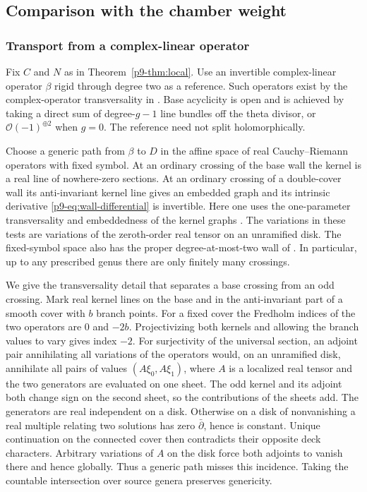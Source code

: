 \subsection{Comparison with the chamber weight}\label{p9-sec:comparison}

\subsubsection{Transport from a complex-linear operator}
Fix $C$ and $N$ as in Theorem~\ref{p9-thm:local}. Use an invertible
complex-linear operator $\beta$ rigid through degree two as a reference.
Such operators exist by the complex-operator transversality in
\cite[Lemmas~5.3, 5.6 and~5.15(ii), Definition~5.17]{bai}. Base acyclicity is
open and is achieved by taking a direct sum of degree-$g-1$ line
bundles off the theta divisor, or $\mathcal O(-1)^{\oplus2}$ when
$g=0$. The reference need not split holomorphically.

Choose a generic path from $\beta$ to $D$ in the affine space of real
Cauchy--Riemann operators with fixed symbol. At an ordinary crossing
of the base wall the kernel is a real line of nowhere-zero sections.
At an ordinary crossing of a double-cover wall its anti-invariant
kernel line gives an embedded graph and its intrinsic derivative
\eqref{p9-eq:wall-differential} is invertible. Here one uses the
one-parameter transversality and embeddedness of the kernel graphs
\cite[Lemmas~5.6, 5.11, 5.15--5.16]{bai}. The variations in these tests
are variations of the zeroth-order real tensor on an unramified disk.
The fixed-symbol space also has the proper degree-at-most-two wall of
\cite[Definition~2.6, Proposition~2.7 and Theorem~3.40]{dw}. In
particular, up to any prescribed genus there are only finitely many
crossings.

We give the transversality detail that separates a base crossing from
an odd crossing. Mark real kernel lines on the base and in the
anti-invariant part of a smooth cover with $b$ branch points. For a
fixed cover the Fredholm indices of the two operators are $0$ and
$-2b$. Projectivizing both kernels and allowing the branch values to
vary gives index $-2$. For surjectivity of the universal section,
an adjoint pair annihilating all variations of the operators would,
on an unramified disk, annihilate all pairs of values
$(A\xi_0,A\xi_1)$, where $A$ is a localized real tensor and the two
generators are evaluated on one sheet. The odd kernel and its
adjoint both change sign on the second sheet, so the contributions
of the sheets add. The generators are real independent on a disk.
Otherwise on a disk of nonvanishing a real multiple relating two
solutions has zero $\bar\partial$, hence is constant. Unique
continuation on the connected cover then contradicts their opposite
deck characters. Arbitrary variations of $A$ on the disk force both
adjoints to vanish there and hence globally. Thus a generic path
misses this incidence. Taking the countable intersection over source
genera preserves genericity.

